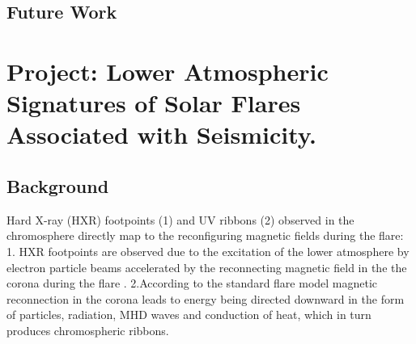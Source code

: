 \subsection{Future Work}




\section{Project: Lower Atmospheric Signatures of Solar Flares Associated with Seismicity.}\label{PRJ}

\subsection{Background}
Hard X-ray (HXR) footpoints (1) and UV ribbons (2) observed in the chromosphere directly map to the reconfiguring magnetic fields during the flare: 
1. HXR footpoints are observed due to the excitation of the lower atmosphere by electron particle beams accelerated by the reconnecting magnetic field in the the corona during the flare \citep{1995ApJ...455..347A}.
2.According to the standard flare model \citep{1964NASSP..50..451C, 1966Natur.211..695S, 1974SoPh...34..323H, 1976SoPh...50...85K} magnetic reconnection in the corona leads to energy being directed downward in the form of particles, radiation, MHD waves and conduction of heat, which in turn produces chromospheric ribbons.\\

